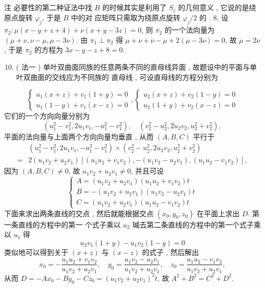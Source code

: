 \documentclass[10pt]{article}
\begin{document}
 注   必要性的第二种证法中找  $B$  的时候其实是利用了  $S_{j}$  的几何意义 ,  它说的是绕原点旋转  $\varphi_{j}$,  于是  $B$  中的对   应矩阵只需取为绕原点旋转  $\varphi_{j} / 2$  的 . 8.  设  $\pi_{2}: \mu(x-y+z+4)+\nu(x+y-3 z)=0$,  则  $\pi_{2}$  的一个法向量为  $(\mu+\nu, \nu-\mu, \mu-3 \nu)$.  由  $\pi_{1} \perp \pi_{2}$  得  $\mu+\nu+\nu-\mu+2(\mu-3 \nu)=0$,  故  $\mu=2 \nu$,  于是  $\pi_{2}$  的方程为  $3 x-y-z+8=0$.

\begin{enumerate}
  \setcounter{enumi}{9}
  \item ( 法一 )  单叶双曲面同族的任意两条不同的直母线异面 ,  故题设中的平面与单叶双曲面的交线应为不同族的   直母线 ,  可设直母线的方程分别为 
\end{enumerate}
$$
\left\{\begin{array}{l}
u_{1}(x+z)+v_{1}(1+y)=0 \\
u_{1}(1-y)+v_{1}(x-z)=0
\end{array},\left\{\begin{array}{l}
u_{2}(x+z)+v_{2}(1-y)=0 \\
u_{2}(1+y)+v_{2}(x-z)=0
\end{array}\right.\right.
$$
 它们的一个方向向量分别为 
$$
\left(u_{1}^{2}-v_{1}^{2}, 2 u_{1} v_{1},-u_{1}^{2}-v_{1}^{2}\right), \quad\left(v_{2}^{2}-u_{2}^{2}, 2 u_{2} v_{2}, u_{2}^{2}+v_{2}^{2}\right),
$$
 平面的法向量与上面两个方向向量均垂直 ,  从而  $(A, B, C)$  平行于 
$$
\begin{aligned}
&\left(u_{1}^{2}-v_{1}^{2}, 2 u_{1} v_{1},-u_{1}^{2}-v_{1}^{2}\right) \times\left(v_{2}^{2}-u_{2}^{2}, 2 u_{2} v_{2}, u_{2}^{2}+v_{2}^{2}\right) \\
=& 2\left(u_{1} v_{2}+u_{2} v_{1}\right)\left[\left(u_{1} u_{2}+v_{1} v_{2}\right),-\left(u_{1} v_{2}-u_{2} v_{1}\right),\left(u_{1} u_{2}-v_{1} v_{2}\right)\right],
\end{aligned}
$$
 因为  $(A, B, C) \neq 0$,  故  $u_{1} v_{2}+u_{2} v_{1} \neq 0$,  并且可设 
$$
\left\{\begin{array}{l}
A=\left(u_{1} v_{2}+u_{2} v_{1}\right)\left(u_{1} u_{2}+v_{1} v_{2}\right) t \\
B=-\left(u_{1} v_{2}+u_{2} v_{1}\right)\left(u_{1} v_{2}-u_{2} v_{1}\right) t \\
C=\left(u_{1} v_{2}+u_{2} v_{1}\right)\left(u_{1} u_{2}-v_{1} v_{2}\right) t
\end{array}\right.
$$
 下面来求出两条直线的交点 ,  然后就能根据交点  $\left(x_{0}, y_{0}, z_{0}\right)$  在平面上求出  $D$.  第一条直线的方程中的第一   个式子乘以  $u_{2}$  瑊去第二条直线的方程中的第一个式子乘以  $u_{1}$  得 
$$
u_{2} v_{1}(1+y)-u_{1} v_{2}(1-y)=0
$$
 类似地可以得到关于  $(x+z)$  与  $(x-z)$  的式子 ,  然后解出 
$$
x_{0}=-\frac{u_{1} u_{2}+v_{1} v_{2}}{u_{1} v_{2}+u_{2} v_{1}}, \quad y_{0}=\frac{u_{1} v_{2}-u_{2} v_{1}}{u_{1} v_{2}+u_{2} v_{1}}, \quad z_{0}=\frac{u_{1} u_{2}-v_{1} v_{2}}{u_{1} v_{2}+u_{2} v_{1}},
$$
 从而  $D=-A x_{0}-B y_{0}-C z_{0}=\left(u_{1} v_{2}+u_{2} v_{1}\right)^{2} t$,  故  $A^{2}+B^{2}=C^{2}+D^{2}$.
\end{document}
